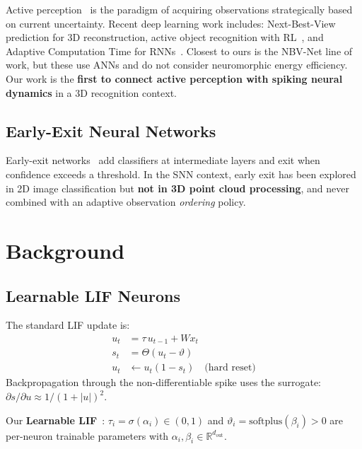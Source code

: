 \documentclass[11pt,a4paper]{article}
\begin{document}
Active perception~\cite{ballard1991,bajcsy1988} is the paradigm of acquiring
observations strategically based on current uncertainty. Recent deep learning
work includes: Next-Best-View prediction for 3D reconstruction, active object
recognition with RL~\cite{johns2016}, and Adaptive Computation Time for
RNNs~\cite{graves2016}. Closest to ours is the NBV-Net line of work, but these
use ANNs and do not consider neuromorphic energy efficiency. Our work is the
\textbf{first to connect active perception with spiking neural dynamics} in a
3D recognition context.

\subsection{Early-Exit Neural Networks}

Early-exit networks~\cite{teerapittayanon2016,huang2018} add classifiers at
intermediate layers and exit when confidence exceeds a threshold. In the SNN
context, early exit has been explored in 2D image classification but
\textbf{not in 3D point cloud processing}, and never combined with an adaptive
observation \emph{ordering} policy.

\section{Background}

\subsection{Learnable LIF Neurons}

The standard LIF update is:
\begin{align}
  u_t &= \tau\, u_{t-1} + W x_t \label{eq:lif_mem}\\
  s_t &= \Theta(u_t - \vartheta) \label{eq:lif_spike}\\
  u_t &\leftarrow u_t(1 - s_t) \quad\text{(hard reset)} \label{eq:lif_reset}
\end{align}
Backpropagation through the non-differentiable spike uses the surrogate:
$\partial s/\partial u \approx 1/(1+|u|)^2$.

Our \textbf{Learnable LIF}~\cite{purdue2026}: $\tau_i = \sigma(\alpha_i) \in
(0,1)$ and $\vartheta_i = \text{softplus}(\beta_i) > 0$ are per-neuron
trainable parameters with $\alpha_i, \beta_i \in \mathbb{R}^{d_\text{out}}$.
\end{document}
